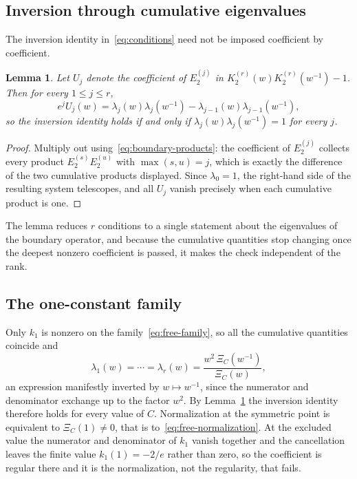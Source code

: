 \documentclass[
  aps,pre,
  reprint,
  superscriptaddress,
  amsmath,amssymb,
  floatfix
]{revtex4-2}
\theoremstyle{plain}
\newtheorem{lemma}[theorem]{Lemma}
\theoremstyle{definition}
\theoremstyle{remark}
\begin{document}
\subsection{Inversion through cumulative eigenvalues}

The inversion identity in~\eqref{eq:conditions} need not be imposed
coefficient by coefficient.

\begin{lemma}
\label{lem:cumulative}
Let $U_j$ denote the coefficient of $E_2^{(j)}$ in
$K_2^{(r)}(w)K_2^{(r)}(w^{-1})-1$. Then for every $1\le j\le r$,
\begin{equation}
  e^{j}U_j(w)=\lambda_j(w)\lambda_j(w^{-1})-\lambda_{j-1}(w)\lambda_{j-1}(w^{-1}),
  \label{eq:cumulative-telescope}
\end{equation}
so the inversion identity holds if and only if
$\lambda_j(w)\lambda_j(w^{-1})=1$ for every $j$.
\end{lemma}

\begin{proof}
Multiply out using~\eqref{eq:boundary-products}: the coefficient of
$E_2^{(j)}$ collects every product $E_2^{(s)}E_2^{(u)}$ with
$\max(s,u)=j$, which is exactly the difference of the two cumulative products
displayed. Since $\lambda_0=1$, the right-hand side of the resulting system
telescopes, and all $U_j$ vanish precisely when each cumulative product is one.
\end{proof}

The lemma reduces $r$ conditions to a single statement about the eigenvalues of
the boundary operator, and because the cumulative quantities stop changing once
the deepest nonzero coefficient is passed, it makes the check independent of
the rank.

\subsection{The one-constant family}

Only $k_1$ is nonzero on the family~\eqref{eq:free-family}, so all the
cumulative quantities coincide and
\begin{equation}
  \lambda_1(w)=\cdots=\lambda_r(w)
  =\frac{w^2\,\Xi_C(w^{-1})}{\Xi_C(w)} ,
  \label{eq:free-lambda}
\end{equation}
an expression manifestly inverted by $w\mapsto w^{-1}$, since the numerator and
denominator exchange up to the factor $w^{2}$. By
Lemma~\ref{lem:cumulative} the inversion identity therefore holds for every
value of $C$. Normalization at the symmetric point is equivalent to
$\Xi_C(1)\ne0$, that is to~\eqref{eq:free-normalization}. At the excluded value
the numerator and denominator of $k_1$ vanish together and the cancellation
leaves the finite value $k_1(1)=-2/e$ rather than zero, so the coefficient is
regular there and it is the normalization, not the regularity, that fails.
\end{document}
